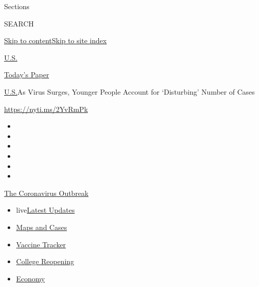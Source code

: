 Sections

SEARCH

\protect\hyperlink{site-content}{Skip to
content}\protect\hyperlink{site-index}{Skip to site index}

\href{https://www.nytimes3xbfgragh.onion/section/us}{U.S.}

\href{https://myaccount.nytimes3xbfgragh.onion/auth/login?response_type=cookie\&client_id=vi}{}

\href{https://www.nytimes3xbfgragh.onion/section/todayspaper}{Today's
Paper}

\href{/section/us}{U.S.}\textbar{}As Virus Surges, Younger People
Account for `Disturbing' Number of Cases

\url{https://nyti.ms/2YvRmPk}

\begin{itemize}
\item
\item
\item
\item
\item
\item
\end{itemize}

\href{https://www.nytimes3xbfgragh.onion/news-event/coronavirus?action=click\&pgtype=Article\&state=default\&region=TOP_BANNER\&context=storylines_menu}{The
Coronavirus Outbreak}

\begin{itemize}
\tightlist
\item
  live\href{https://www.nytimes3xbfgragh.onion/2020/08/04/world/coronavirus-cases.html?action=click\&pgtype=Article\&state=default\&region=TOP_BANNER\&context=storylines_menu}{Latest
  Updates}
\item
  \href{https://www.nytimes3xbfgragh.onion/interactive/2020/us/coronavirus-us-cases.html?action=click\&pgtype=Article\&state=default\&region=TOP_BANNER\&context=storylines_menu}{Maps
  and Cases}
\item
  \href{https://www.nytimes3xbfgragh.onion/interactive/2020/science/coronavirus-vaccine-tracker.html?action=click\&pgtype=Article\&state=default\&region=TOP_BANNER\&context=storylines_menu}{Vaccine
  Tracker}
\item
  \href{https://www.nytimes3xbfgragh.onion/2020/08/02/us/covid-college-reopening.html?action=click\&pgtype=Article\&state=default\&region=TOP_BANNER\&context=storylines_menu}{College
  Reopening}
\item
  \href{https://www.nytimes3xbfgragh.onion/live/2020/08/04/business/stock-market-today-coronavirus?action=click\&pgtype=Article\&state=default\&region=TOP_BANNER\&context=storylines_menu}{Economy}
\end{itemize}


